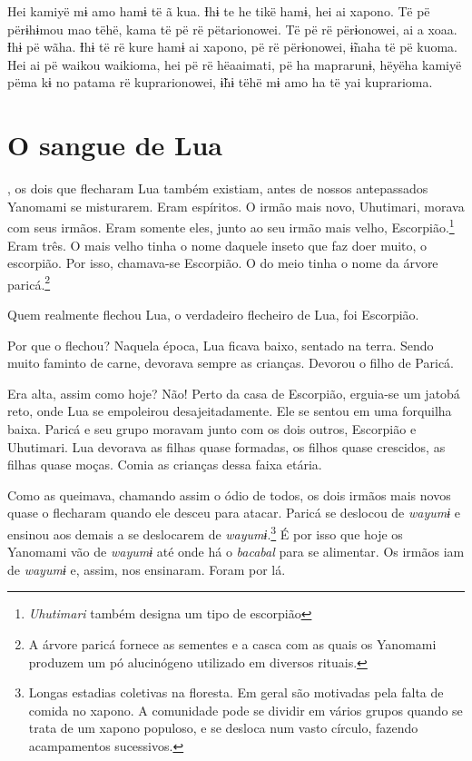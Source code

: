 Hei kamiyë mɨ amo hamɨ të ã kua. Ɨhɨ te he tikë hamɨ, hei ai xapono. Të
pë përɨhɨmou mao tëhë, kama të pë rë pëtarionowei. Të pë rë përɨonowei,
ai a xoaa. Ɨhɨ pë wãha. Ɨhɨ të rë kure hamɨ ai xapono, pë rë përɨonowei,
ɨ̃naha të pë kuoma. Hei ai pë waikou waikioma, hei pë rë hëaaimati, pë ha
maprarunɨ, hëyëha kamiyë pëma kɨ no patama rë kuprarionowei, ɨ̃hɨ tëhë mɨ
amo ha të yai kuprarioma. 

\chapter{O sangue de Lua}
 
, os dois que flecharam Lua também existiam, antes de nossos
antepassados Yanomami se misturarem. Eram espíritos. O irmão mais novo,
Uhutimari, morava com seus irmãos. Eram somente eles, junto ao seu irmão
mais velho, Escorpião.\footnote{\textit{Uhutimari} também designa um tipo de escorpião} Eram três. O mais velho tinha o nome daquele
inseto que faz doer muito, o escorpião. Por isso, chamava-se Escorpião.
O do meio tinha o nome da árvore paricá.\footnote{A árvore paricá fornece as sementes e a casca com as quais os Yanomami
produzem um pó alucinógeno utilizado em diversos rituais.} 

Quem realmente flechou Lua, o verdadeiro flecheiro de Lua, foi
Escorpião. 

Por que o flechou? Naquela época, Lua ficava baixo, sentado na
terra. Sendo muito faminto de carne, devorava sempre as crianças.
Devorou o filho de Paricá. 

Era alta, assim como hoje? Não! Perto da casa de Escorpião, erguia-se um
jatobá reto, onde Lua se empoleirou desajeitadamente. Ele se sentou em
uma forquilha baixa. Paricá e seu grupo moravam junto com os dois
outros, Escorpião e Uhutimari. Lua devorava as filhas quase formadas,
os filhos quase crescidos, as filhas quase moças. Comia as crianças
dessa faixa etária. 

Como as queimava, chamando assim o ódio de todos, os dois irmãos
mais novos quase o flecharam quando ele desceu para
atacar. Paricá se deslocou de \textit{wayumɨ} e ensinou aos
demais a se deslocarem de \textit{wayumɨ}.\footnote{Longas estadias coletivas na floresta. Em geral são motivadas pela falta de comida no xapono. A comunidade pode se dividir em vários grupos quando se trata de um xapono populoso, e se desloca num vasto círculo, fazendo acampamentos sucessivos.} É por isso que hoje os Yanomami
vão de \textit{wayumɨ} até onde há o \textit{bacabal} para se alimentar. Os irmãos iam
de \textit{wayumɨ} e, assim, nos ensinaram. Foram por lá.

